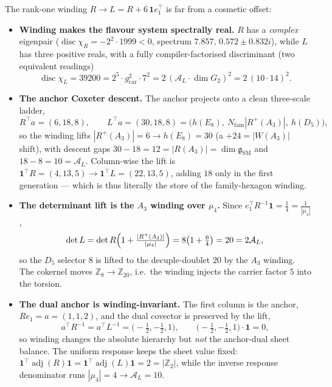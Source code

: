 \documentclass[11pt,a4paper]{article}
\newcommand{\gcar}{g_{\mathrm{car}}}
\newcommand{\Nfam}{N_{\mathrm{fam}}}
\newcommand{\Z}{\mathbb{Z}}
\theoremstyle{definition}
\begin{document}
\begin{winbox}
The rank-one winding $R\to L=R+6\,\mathbf 1 e_1^{\!\top}$ is far from a cosmetic offset:
\begin{itemize}\setlength\itemsep{2pt}
\item\textbf{Winding makes the flavour system spectrally real.} $R$ has a \emph{complex} eigenpair
($\operatorname{disc}\chi_R=-2^2\cdot1999<0$, spectrum $7.857,\,0.572\pm0.832i$), while $L$ has three
positive reals, with a fully compiler-factorised discriminant (two equivalent readings)
\[
  \operatorname{disc}\chi_L=39200=2^{5}\cdot\gcar^{2}\cdot7^{2}
  =2\,(\mathcal A_L\cdot\dim G_2)^2=2\,(10\cdot14)^2 .
\]
\item\textbf{The anchor Coxeter descent.} The anchor projects onto a clean three-scale ladder,
\[
  R^{\!\top}a=(6,18,8),\qquad L^{\!\top}a=(30,18,8)=\bigl(h(E_8),\ \Nfam|R^+(A_3)|,\ h(D_5)\bigr),
\]
so the winding lifts $|R^+(A_3)|=6\to h(E_8)=30$ (a $+24=|W(A_3)|$ shift), with descent gaps
$30-18=12=|R(A_3)|=\dim\mathfrak g_{\mathrm{SM}}$ and $18-8=10=\mathcal A_L$. Column-wise the lift is
$\mathbf1^{\!\top}R=(4,13,5)\to\mathbf1^{\!\top}L=(22,13,5)$, adding $18$ only in the first generation ---
which is thus literally the store of the family-hexagon winding.
\item\textbf{The determinant lift is the $A_3$ winding over $\mu_4$.} Since $e_1^{\!\top}R^{-1}\mathbf1=\tfrac14=\tfrac1{|\mu_4|}$,
\[
  \det L=\det R\Bigl(1+\tfrac{|R^+(A_3)|}{|\mu_4|}\Bigr)=8\bigl(1+\tfrac64\bigr)=20=2\mathcal A_L,
\]
so the $D_5$ selector $8$ is lifted to the decuple-doublet $20$ by the $A_3$ winding. The cokernel moves
$\Z_8\to\Z_{20}$, i.e.\ the winding injects the carrier factor $5$ into the torsion.
\item\textbf{The dual anchor is winding-invariant.} The first column is the anchor, $R e_1=a=(1,1,2)$, and
the dual covector is preserved by the lift,
\[
  a^{\!\top}R^{-1}=a^{\!\top}L^{-1}=\bigl(-\tfrac12,-\tfrac12,1\bigr),\qquad
  \bigl(-\tfrac12,-\tfrac12,1\bigr)\!\cdot\!\mathbf1=0 ,
\]
so winding changes the absolute hierarchy but \emph{not} the anchor-dual sheet balance. The uniform
response keeps the sheet value fixed: $\mathbf1^{\!\top}\!\operatorname{adj}(R)\mathbf1
=\mathbf1^{\!\top}\!\operatorname{adj}(L)\mathbf1=2=|\Z_2|$, while the inverse response denominator runs
$|\mu_4|=4\to\mathcal A_L=10$. \mE
\end{itemize}
\end{winbox}
\end{document}
